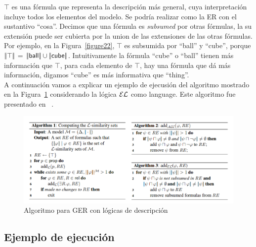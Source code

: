 $\top$ es una f\'ormula que representa la descripci\'on m\'as general, cuya
interpretaci\'on incluye todos los elementos del modelo. Se podr\'ia realizar
como la ER con el sustantivo
``\textsf{cosa}''. Decimos que una f\'ormula es
\emph{subsumed} por otras f\'ormulas, la su extensi\'on puede ser cubierta por la
union de las extensiones de las otras f\'ormulas. Por ejemplo, en la
Figura~\ref{figure22}, $\top$ es subsumida por ``\textsf{ball}'' y
``\textsf{cube}'', porque $|\!|\top|\!|$ = $|\!|\textsf{ball}|\!|
\cup |\!|\textsf{cube}|\!|$.
Intuitivamente la f\'ormula ``\textsf{cube}'' o ``\textsf{ball}'' tienen m\'as informaci\'on que $\top$, para cada elemento de $\top$, hay una f\'ormula que d\'a m\'as informaci\'on, digamos ``\textsf{cube}'' es m\'as informativa que ``\textsf{thing}''.\\

A continuaci\'on vamos a explicar un ejemplo de ejecusi\'on del
algoritmo mostrado en la Figura~\ref{algoritmoOriginal} considerando la l\'ogica 
$\mathcal{EL}$ como language. Este algoritmo fue presentado en
~\cite{arec2:2008:Areces}.

\begin{figure}[h!]
\begin{center}
\includegraphics[width=\textwidth]{images/algoritmoOriginal.png}
\end{center}
\vspace*{-2em}
\caption{Algoritmo para GER con l\'ogicas de descripci\'on}
\label{algoritmoOriginal}
\end{figure}

\subsection{Ejemplo de ejecuci\'on}


